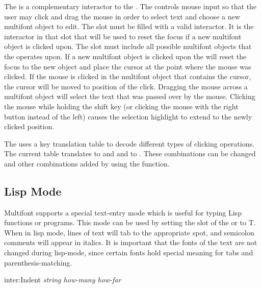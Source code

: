 The  is a complementary interactor to the
.  The  controls
mouse input so that the user may click and drag the mouse in order to select
text and choose a new multifont object to edit.  The 
slot must be filled with a valid 
interactor.  It is the interactor in that slot that will be used to reset the
focus if a new multifont object is clicked upon.  The  slot
must include all possible multifont objects that the 
operates upon.  If a new multifont object is clicked upon the
 will reset the focus to the new object and place the
cursor at the point where the mouse was clicked.  If the mouse is clicked in
the multifont object that contains the cursor, the cursor will be moved to
position of the click.  Dragging the mouse across a multifont object will
select the text that was passed over by the mouse.  Clicking the mouse while
holding the shift key (or clicking the mouse with the right button instead
of the left) causes the selection highlight to extend to the newly clicked
position.

The  uses a key translation table to decode different
types of clicking operations.  The current table translates 
to  and  and  to
.  These combinations can be changed and other
combinations added by using the  function.


\subsection{Lisp Mode}
\label{lisp-mode}

Multifont supports a special text-entry mode which is useful for typing
Lisp functions or programs.  This mode can be used by setting the
 slot of the  or
 to T.  When in lisp mode, lines of text will
tab to the appropriate spot, and semicolon comments will appear in italics.
It is important that the fonts of the text are not changed during lisp-mode,
since certain fonts hold special meaning for tabs and parenthesis-matching.

\vspace{1 line}
\begin{programexample}
inter:Indent {\it string how-many how-far}\value{function}
\end{programexample}

